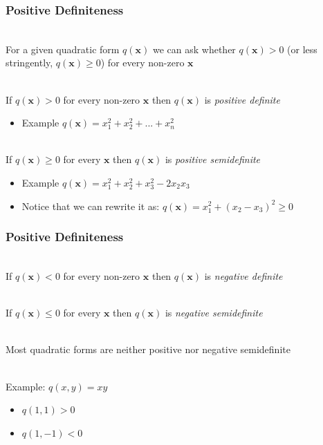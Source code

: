 \documentclass{beamer}
\numberwithin{equation}{section}
\begin{document}
\begin{frame}
\frametitle{Positive Definiteness}

\ \\For a given quadratic form $q(\mathbf{x})$ we can ask whether $q(\mathbf{x})>0$ (or less stringently, $q(\mathbf{x})\geq 0$) for every non-zero $\mathbf{x}$ \pause

\ \\If  $q(\mathbf{x})>0$ for every non-zero $\mathbf{x}$ then $q(\mathbf{x})$ is \textit{positive definite} \pause

\begin{itemize}
\item Example $q(\mathbf{x}) = x_1^2+x_2^2+...+x_n^2$
\end{itemize} \pause

\ \\If  $q(\mathbf{x})\geq 0$ for every $\mathbf{x}$ then $q(\mathbf{x})$ is \textit{positive semidefinite} \pause

\begin{itemize}
\item Example $q(\mathbf{x}) = x_1^2+x_2^2+x_3^2-2x_2x_3$ \pause
\item Notice that we can rewrite it as: $q(\mathbf{x}) = x_1^2+(x_2-x_3)^2 \geq 0$
\end{itemize}

\end{frame}



\begin{frame}
\frametitle{Positive Definiteness}

\ \\If  $q(\mathbf{x})<0$ for every non-zero $\mathbf{x}$ then $q(\mathbf{x})$ is \textit{negative definite} \pause

\ \\If  $q(\mathbf{x})\leq 0$ for every $\mathbf{x}$ then $q(\mathbf{x})$ is \textit{negative semidefinite} \pause

\ \\Most  quadratic forms are neither positive nor negative semidefinite \pause

\ \\Example: $q(x, y)=xy$
\begin{itemize}
\item $q(1, 1)>0$
\item $q(1, -1)<0$
\end{itemize}

\end{frame}
\end{document}
